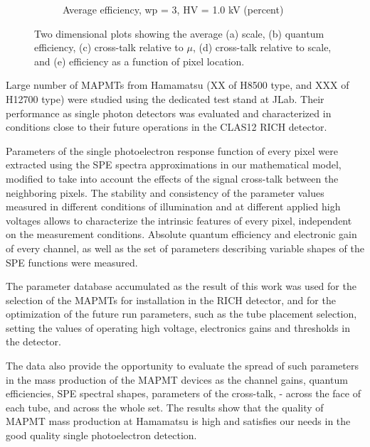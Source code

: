 \begin{figure}[hbt]
\begin{subfigure}[c]{0.24\linewidth}
		\caption{Average efficiency, wp = 3, HV = 1.0 kV (percent)}
		\vspace{0mm}
	\end{subfigure}%
	\caption{Two dimensional plots showing the average (a) scale, (b) quantum efficiency, (c) cross-talk relative to $\mu$, (d) cross-talk relative to scale, and (e) efficiency as a function of pixel location.}
	\label{fig:2d_avg_fit_results}
\end{figure}



Large number of MAPMTs from Hamamatsu (XX of H8500 type, and XXX of H12700 type) were studied using the dedicated test stand at JLab. Their performance as single photon detectors was evaluated and characterized in conditions close to their future operations in the CLAS12 RICH detector.


Parameters of the single photoelectron response function of every pixel were extracted using the SPE spectra approximations in our mathematical model, modified to take into account the effects of the signal cross-talk between the neighboring pixels. The stability and consistency of the parameter values measured in different conditions of illumination and at different applied high voltages allows to characterize the intrinsic features of every pixel, independent on the measurement conditions. Absolute quantum efficiency and electronic gain of every channel, as well as the set of parameters describing variable shapes of the SPE functions were measured.


The parameter database accumulated as the result of this work was used for the selection of the MAPMTs for installation in the RICH detector, and for the optimization of the future run parameters, such as the tube placement selection, setting the values of operating high voltage, electronics gains and thresholds in the detector.


The data also provide the opportunity to evaluate the spread of such parameters in the mass production of the MAPMT devices as the channel gains, quantum efficiencies, SPE spectral shapes, parameters of the cross-talk, - across the face of each tube, and across the whole set. The results show that the quality of MAPMT mass production at Hamamatsu is high and satisfies our needs in the good quality single photoelectron detection.




